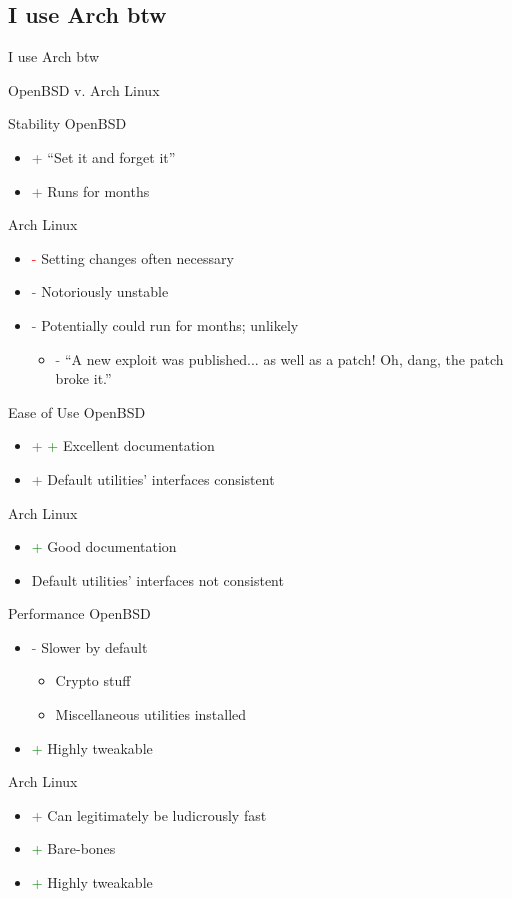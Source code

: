 \documentclass{beamer}
\newcommand{\good}{\textcolor{green}{+ }}
\newcommand{\bad}{\textcolor{red}{- }}
\begin{document}
		\subsection{I use Arch btw}
			\begin{frame}{I use Arch btw}
				\begin{center}
					OpenBSD v. Arch Linux
				\end{center}
			\end{frame}
			\begin{frame}{Stability}
				OpenBSD
				\begin{itemize}
					\item \good ``Set it and forget it''
					\item \good Runs for months
				\end{itemize}
				Arch Linux
				\begin{itemize}
					\item \bad Setting changes often necessary
					\item \bad Notoriously unstable
					\item \bad Potentially could run for months; unlikely
					\begin{itemize}
						\item \bad ``A new exploit was published... as well as a patch!  Oh, dang, the patch broke it.''
					\end{itemize}
				\end{itemize}
			\end{frame}
			\begin{frame}{Ease of Use}
				OpenBSD
				\begin{itemize}
					\item \good \good Excellent documentation
					\item \good Default utilities' interfaces consistent
				\end{itemize}
				Arch Linux
				\begin{itemize}
					\item \good Good documentation
					\item Default utilities' interfaces not consistent
				\end{itemize}
			\end{frame}
			\begin{frame}{Performance}
				OpenBSD
				\begin{itemize}
					\item \bad Slower by default
					\begin{itemize}
						\item Crypto stuff
						\item Miscellaneous utilities installed
					\end{itemize}
					\item \good Highly tweakable
				\end{itemize}
				Arch Linux
				\begin{itemize}
					\item \good Can legitimately be ludicrously fast
					\item \good Bare-bones
					\item \good Highly tweakable
				\end{itemize}
			\end{frame}
\end{document}
